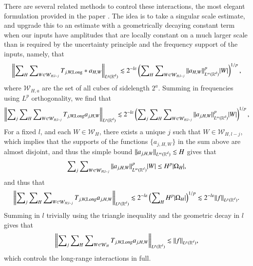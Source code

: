 There are several related methods to control these interactions, the most elegant formulation provided in the paper \cite{HeoandNazarovandSeeger2}. The idea is to take a singular scale estimate, and upgrade this to an estimate with a geometrically decaying constant term when our inputs have amplitudes that are locally constant on a much larger scale than is required by the uncertainty principle and the frequency support of the inputs, namely, that
%
\[ \left\| \sum\nolimits_H \sum\nolimits_{W \in \mathcal{W}_{H,l-j}} T_{j,W,\text{Long}} * a_{H,W} \right\|_{L^q(\operatorname{\mathbb{R}}^d)} \lesssim 2^{-l \varepsilon} \left( \sum\nolimits_H \sum\nolimits_{W \in \mathcal{W}_{H,l-j}} \| a_{H,W} \|_{L^\infty(\operatorname{\mathbb{R}}^d)}^p |W| \right)^{1/p}, \]
%
where $\mathcal{W}_{H,a}$ are the set of all cubes of sidelength $2^a$. Summing in frequencies using $L^p$ orthogonality, we find that
%
\[ \left\| \sum\nolimits_j \sum\nolimits_H \sum\nolimits_{W \in \mathcal{W}_{H,l-j}} T_{j,W,\text{Long}} a_{j,H,W} \right\|_{L^p(\operatorname{\mathbb{R}}^d)} \lesssim 2^{-l \varepsilon} \left( \sum\nolimits_j \sum\nolimits_H \sum\nolimits_{W \in \mathcal{W}_{H,l-j}} \| a_{j,H,W} \|_{L^\infty(\operatorname{\mathbb{R}}^d)}^p |W| \right)^{1/p}, \]
%
For a fixed $l$, and each $W \in \mathcal{W}_H$, there exists a unique $j$ such that $W \in \mathcal{W}_{H,l-j}$, which implies that the supports of the functions $\{ a_{j,H,W} \}$ in the sum above are almost disjoint, and thus the simple bound $\| a_{j,H,W} \|_{L^\infty(\operatorname{\mathbb{R}}^d)} \lesssim H$ gives that
%
\[ \sum\nolimits_j \sum\nolimits_{W \in \mathcal{W}_{H,l-j}} \| a_{j,H,W} \|_{L^\infty(\operatorname{\mathbb{R}}^d)}^p |W| \leq H^p |\Omega_H|, \]
%
and thus that
%
\[ \left\| \sum\nolimits_j \sum\nolimits_H \sum\nolimits_{W \in \mathcal{W}_{H,l-j}} T_{j,W,\text{Long}} a_{j,H,W} \right\|_{L^p(\operatorname{\mathbb{R}}^d)} \lesssim 2^{-l \varepsilon} \left( \sum\nolimits_H H^p |\Omega_H| \right)^{1/p} \lesssim 2^{-l\varepsilon} \| f \|_{L^p(\operatorname{\mathbb{R}}^d)}. \]
%
Summing in $l$ trivially using the triangle inequality and the geometric decay in $l$ gives that
%
\[ \left\| \sum\nolimits_j \sum\nolimits_H \sum\nolimits_{W \in \mathcal{W}_{H}} T_{j,W,\text{Long}} a_{j,H,W} \right\|_{L^p(\operatorname{\mathbb{R}}^d)} \lesssim \| f \|_{L^p(\operatorname{\mathbb{R}}^d)}, \]
%
which controls the long-range interactions in full.

%
%

